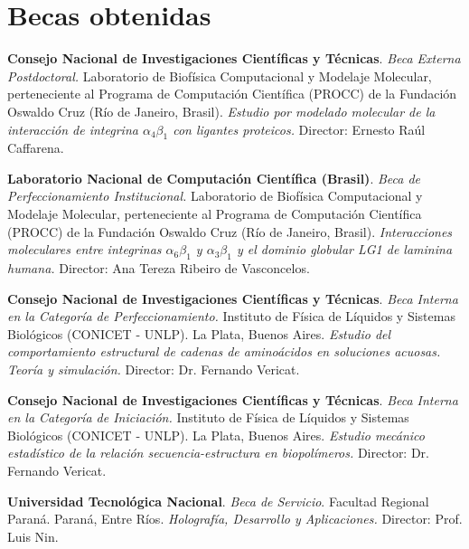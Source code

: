 \section{Becas obtenidas}
\begin{timeline}
 \textbf{Consejo Nacional de Investigaciones Científicas y Técnicas}. \emph{Beca Externa Postdoctoral.} Laboratorio de Biofísica Computacional y Modelaje Molecular, perteneciente al Programa de Computación Científica (PROCC) de la Fundación Oswaldo Cruz (Río de Janeiro, Brasil). \textit{Estudio por modelado molecular de la interacción de integrina $\alpha_4 \beta_1$ con ligantes proteicos.} Director: Ernesto Raúl Caffarena.

 \textbf{Laboratorio Nacional de Computación Científica (Brasil)}. \emph{Beca de Perfeccionamiento Institucional.} Laboratorio de Biofísica Computacional y Modelaje Molecular, perteneciente al Programa de Computación Científica (PROCC) de la Fundación Oswaldo Cruz (Río de Janeiro, Brasil). \textit{Interacciones moleculares entre integrinas $\alpha_6 \beta_1$ y $\alpha_3 \beta_1$ y el dominio globular LG1 de laminina humana.} Director: Ana Tereza Ribeiro de Vasconcelos.

 \textbf{Consejo Nacional de Investigaciones Científicas y Técnicas}. \emph{Beca Interna en la Categoría de Perfeccionamiento.} Instituto de Física de Líquidos y Sistemas Biológicos (CONICET - UNLP). La Plata, Buenos Aires. \textit{Estudio del comportamiento estructural de cadenas de aminoácidos en soluciones acuosas. Teoría y simulación.} Director: Dr. Fernando Vericat.

 \textbf{Consejo Nacional de Investigaciones Científicas y Técnicas}. \emph{Beca Interna en la Categoría de Iniciación.} Instituto de Física de Líquidos y Sistemas Biológicos (CONICET - UNLP). La Plata, Buenos Aires. \textit{Estudio mecánico estadístico de la relación secuencia-estructura en biopolímeros.} Director: Dr. Fernando Vericat.

 \textbf{Universidad Tecnológica Nacional}.   \emph{Beca de Servicio}. Facultad Regional Paraná. Paraná, Entre Ríos. \textit{Holografía, Desarrollo y Aplicaciones.} Director: Prof. Luis Nin.
\end{timeline}
